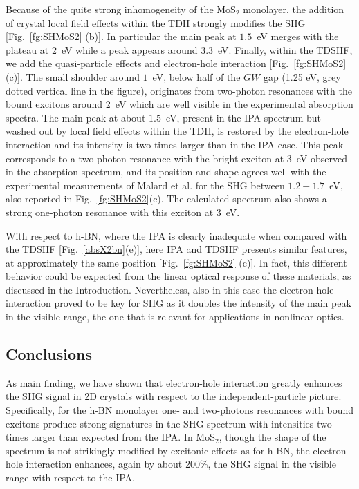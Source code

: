 Because of the quite strong inhomogeneity of the MoS$_2$ monolayer, the addition of crystal local field effects within the TDH strongly modifies the SHG  [Fig.~\ref{fg:SHMoS2} (b)]. 
In particular the main peak at $1.5$~eV merges with the plateau at $2$~eV while a peak appears around $3.3$~eV.
Finally, within the TDSHF, we add the quasi-particle effects and electron-hole interaction  [Fig.~\ref{fg:SHMoS2} (c)]. The small shoulder around $1$~eV, below half of the $GW$ gap (1.25 eV, grey dotted vertical line in the figure), originates from two-photon resonances with the bound excitons around $2$~eV which are well visible in the experimental absorption spectra.\cite{PhysRevLett.105.136805}  The main peak at about $1.5$~eV, present in the IPA spectrum but washed out by local field effects within the TDH, is restored by the electron-hole interaction and its intensity is two times larger than in the IPA case. This peak corresponds to a two-photon resonance with the bright exciton at 3~eV observed in the absorption spectrum,\cite{molina2013effect} and its position and shape agrees well with the experimental measurements of Malard et al.\cite{PhysRevB.87.201401} for the SHG between $1.2-1.7$~eV, also reported in Fig.~\ref{fg:SHMoS2}(c). The calculated spectrum also shows a strong one-photon resonance with this exciton at 3~eV.

With respect to h-BN, where the IPA is clearly inadequate when compared with the TDSHF [Fig.~\ref{absX2bn}(e)], here IPA and TDSHF  presents similar features, at approximately the same position [Fig.~\ref{fg:SHMoS2} (c)]. In fact, this different behavior could be expected from the linear optical response of these materials, as discussed in the Introduction. Nevertheless, also in this case the electron-hole interaction proved to be key for SHG as it doubles the intensity of the main peak in the visible range, the one that is relevant for applications in nonlinear optics.      

\subsection{Conclusions}
As main finding, we have shown that electron-hole interaction greatly enhances the SHG signal in 2D crystals with respect to the independent-particle picture. Specifically, for the h-BN monolayer one- and two-photons resonances with bound excitons produce strong signatures in the SHG spectrum with intensities two times larger than expected from the IPA. In MoS$_2$, though the shape of the spectrum is not strikingly modified by excitonic effects as for h-BN, the electron-hole interaction enhances, again by about 200\%, the SHG signal in the visible range with respect to the IPA. 
 
